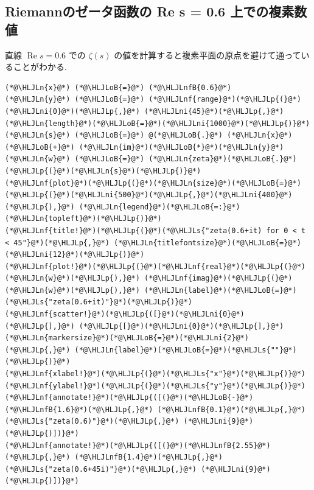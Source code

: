 \documentclass[12pt,a4paper,xelatex,ja=standard]{bxjsarticle}
\newcommand{\HLJLn}[1]{#1}
\newcommand{\HLJLnf}[1]{\textcolor[RGB]{66,102,213}{#1}}
\newcommand{\HLJLs}[1]{\textcolor[RGB]{201,61,57}{#1}}
\newcommand{\HLJLnfB}[1]{\textcolor[RGB]{59,151,46}{#1}}
\newcommand{\HLJLni}[1]{\textcolor[RGB]{59,151,46}{#1}}
\newcommand{\HLJLoB}[1]{\textcolor[RGB]{102,102,102}{\textbf{#1}}}
\newcommand{\HLJLp}[1]{#1}
\newcommand\real{\operatorname{Re}}
\begin{document}
\subsection{Riemannのゼータ函数の Re s = 0.6 上での複素数値}
直線 $\real s = 0.6$ での $\zeta(s)$ の値を計算すると複素平面の原点を避けて通っていることがわかる.


\begin{lstlisting}
(*@\HLJLn{x}@*) (*@\HLJLoB{=}@*) (*@\HLJLnfB{0.6}@*)
(*@\HLJLn{y}@*) (*@\HLJLoB{=}@*) (*@\HLJLnf{range}@*)(*@\HLJLp{(}@*)(*@\HLJLni{0}@*)(*@\HLJLp{,}@*) (*@\HLJLni{45}@*)(*@\HLJLp{,}@*) (*@\HLJLn{length}@*)(*@\HLJLoB{=}@*)(*@\HLJLni{1000}@*)(*@\HLJLp{)}@*)
(*@\HLJLn{s}@*) (*@\HLJLoB{=}@*) @(*@\HLJLoB{.}@*) (*@\HLJLn{x}@*) (*@\HLJLoB{+}@*) (*@\HLJLn{im}@*)(*@\HLJLoB{*}@*)(*@\HLJLn{y}@*)
(*@\HLJLn{w}@*) (*@\HLJLoB{=}@*) (*@\HLJLn{zeta}@*)(*@\HLJLoB{.}@*)(*@\HLJLp{(}@*)(*@\HLJLn{s}@*)(*@\HLJLp{)}@*)
(*@\HLJLnf{plot}@*)(*@\HLJLp{(}@*)(*@\HLJLn{size}@*)(*@\HLJLoB{=}@*)(*@\HLJLp{(}@*)(*@\HLJLni{500}@*)(*@\HLJLp{,}@*)(*@\HLJLni{400}@*)(*@\HLJLp{),}@*) (*@\HLJLn{legend}@*)(*@\HLJLoB{=:}@*)(*@\HLJLn{topleft}@*)(*@\HLJLp{)}@*)
(*@\HLJLnf{title!}@*)(*@\HLJLp{(}@*)(*@\HLJLs{"zeta(0.6+it) for 0 < t < 45"}@*)(*@\HLJLp{,}@*) (*@\HLJLn{titlefontsize}@*)(*@\HLJLoB{=}@*)(*@\HLJLni{12}@*)(*@\HLJLp{)}@*)
(*@\HLJLnf{plot!}@*)(*@\HLJLp{(}@*)(*@\HLJLnf{real}@*)(*@\HLJLp{(}@*)(*@\HLJLn{w}@*)(*@\HLJLp{),}@*) (*@\HLJLnf{imag}@*)(*@\HLJLp{(}@*)(*@\HLJLn{w}@*)(*@\HLJLp{),}@*) (*@\HLJLn{label}@*)(*@\HLJLoB{=}@*)(*@\HLJLs{"zeta(0.6+it)"}@*)(*@\HLJLp{)}@*)
(*@\HLJLnf{scatter!}@*)(*@\HLJLp{([}@*)(*@\HLJLni{0}@*)(*@\HLJLp{],}@*) (*@\HLJLp{[}@*)(*@\HLJLni{0}@*)(*@\HLJLp{],}@*) (*@\HLJLn{markersize}@*)(*@\HLJLoB{=}@*)(*@\HLJLni{2}@*)(*@\HLJLp{,}@*) (*@\HLJLn{label}@*)(*@\HLJLoB{=}@*)(*@\HLJLs{""}@*)(*@\HLJLp{)}@*)
(*@\HLJLnf{xlabel!}@*)(*@\HLJLp{(}@*)(*@\HLJLs{"x"}@*)(*@\HLJLp{)}@*)
(*@\HLJLnf{ylabel!}@*)(*@\HLJLp{(}@*)(*@\HLJLs{"y"}@*)(*@\HLJLp{)}@*)
(*@\HLJLnf{annotate!}@*)(*@\HLJLp{([(}@*)(*@\HLJLoB{-}@*)(*@\HLJLnfB{1.6}@*)(*@\HLJLp{,}@*) (*@\HLJLnfB{0.1}@*)(*@\HLJLp{,}@*) (*@\HLJLs{"zeta(0.6)"}@*)(*@\HLJLp{,}@*) (*@\HLJLni{9}@*)(*@\HLJLp{)])}@*)
(*@\HLJLnf{annotate!}@*)(*@\HLJLp{([(}@*)(*@\HLJLnfB{2.55}@*)(*@\HLJLp{,}@*) (*@\HLJLnfB{1.4}@*)(*@\HLJLp{,}@*) (*@\HLJLs{"zeta(0.6+45i)"}@*)(*@\HLJLp{,}@*) (*@\HLJLni{9}@*)(*@\HLJLp{)])}@*)
\end{lstlisting}
\end{document}

